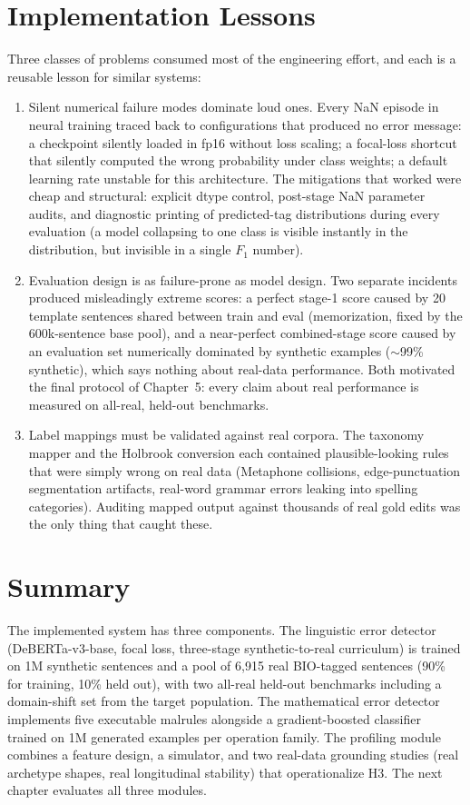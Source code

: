 \section{Implementation Lessons}
\label{sec:impl_lessons}

Three classes of problems consumed most of the engineering effort, and each is a reusable lesson for similar systems:

\begin{enumerate}
    \item Silent numerical failure modes dominate loud ones. Every NaN episode in neural training traced back to configurations that produced no error message: a checkpoint silently loaded in fp16 without loss scaling; a focal-loss shortcut that silently computed the wrong probability under class weights; a default learning rate unstable for this architecture. The mitigations that worked were cheap and structural: explicit dtype control, post-stage NaN parameter audits, and diagnostic printing of predicted-tag distributions during every evaluation (a model collapsing to one class is visible instantly in the distribution, but invisible in a single $F_1$ number).
    \item Evaluation design is as failure-prone as model design. Two separate incidents produced misleadingly extreme scores: a perfect stage-1 score caused by 20 template sentences shared between train and eval (memorization, fixed by the 600k-sentence base pool), and a near-perfect combined-stage score caused by an evaluation set numerically dominated by synthetic examples ($\sim$99\% synthetic), which says nothing about real-data performance. Both motivated the final protocol of Chapter~5: every claim about real performance is measured on all-real, held-out benchmarks.
    \item Label mappings must be validated against real corpora. The taxonomy mapper and the Holbrook conversion each contained plausible-looking rules that were simply wrong on real data (Metaphone collisions, edge-punctuation segmentation artifacts, real-word grammar errors leaking into spelling categories). Auditing mapped output against thousands of real gold edits was the only thing that caught these.
\end{enumerate}

\section{Summary}
\label{sec:impl_summary}

The implemented system has three components. The linguistic error detector (DeBERTa-v3-base, focal loss, three-stage synthetic-to-real curriculum) is trained on 1M synthetic sentences and a pool of 6{,}915 real BIO-tagged sentences (90\% for training, 10\% held out), with two all-real held-out benchmarks including a domain-shift set from the target population. The mathematical error detector implements five executable malrules alongside a gradient-boosted classifier trained on 1M generated examples per operation family. The profiling module combines a feature design, a simulator, and two real-data grounding studies (real archetype shapes, real longitudinal stability) that operationalize H3. The next chapter evaluates all three modules.
